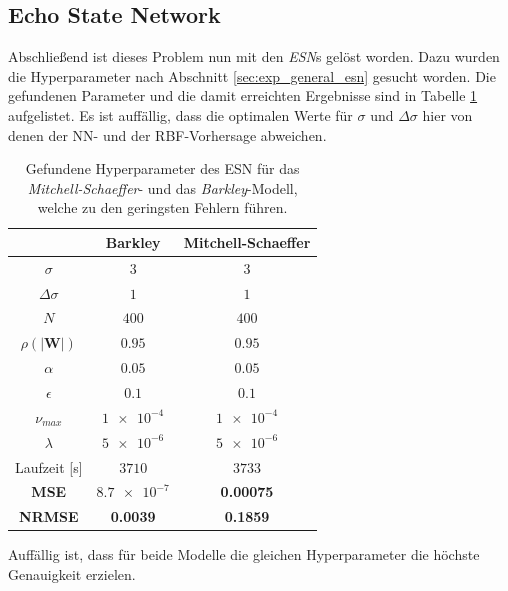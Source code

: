 \subsection{Echo State Network}
Abschließend ist dieses Problem nun mit den \textit{ESN}s gelöst worden. Dazu wurden die Hyperparameter nach Abschnitt \ref{sec:exp_general_esn} gesucht worden. Die gefundenen Parameter und die damit erreichten Ergebnisse sind in Tabelle \ref{tab:exp_cross_esn_results} aufgelistet. Es ist auffällig, dass die optimalen Werte für $\sigma$ und $\Delta \sigma$ hier von denen der NN- und der RBF-Vorhersage abweichen.
\begin{table}[h]
	\centering
	\captionsetup{width=0.9\linewidth}
	\begin{tabular}{|c|c|c|}
		\multicolumn{1}{c|}{} &  Barkley & Mitchell-Schaeffer \\ 
		\hline \hline 
		\rule[-1ex]{0pt}{2.5ex} $\sigma$ & $3$ & $3$ \\ 
		\hline 
		\rule[-1ex]{0pt}{2.5ex} $\Delta \sigma$ & $1$ & $1$ \\ 
		\hline 
		\rule[-1ex]{0pt}{3.5ex} $N$ & $400$ & $400$ \\ 
		\hline 
		\rule[-1ex]{0pt}{3.5ex} $\rho(|\mathbf{W}|)$ & $0.95$ & $0.95$\\ 
		\hline 
		\rule[-1ex]{0pt}{3.5ex} $\alpha$ & $0.05$ & $0.05$ \\ 
		\hline 
		\rule[-1ex]{0pt}{3.5ex} $\epsilon$ & $0.1$ & $0.1$ \\ 
		\hline 
		\rule[-1ex]{0pt}{3.5ex} $\nu_{max}$ & $\num{1e-4}$ & $\num{1e-4}$\\ 
		\hline 
		\rule[-1ex]{0pt}{3.5ex} $\lambda$ & $\num{5e-6}$ & $\num{5e-6}$\\ 
		\hline 
		\rule[-1ex]{0pt}{2.5ex} Laufzeit [s] & $3710$ & $3733$ \\ 
		\hline 
		\rule[-1ex]{0pt}{2.5ex} \textbf{MSE} & \textbf{$\num{8.7e-7}$} & \textbf{0.00075} \\ 
		\hline
		\rule[-1ex]{0pt}{2.5ex} \textbf{NRMSE} & \textbf{0.0039} & \textbf{0.1859} \\ 
		\hline 
	\end{tabular} 
	\caption{Gefundene Hyperparameter des \textsc{ESN} für das \textit{Mitchell-Schaeffer}- und das \textit{Barkley}-Modell, welche zu den geringsten Fehlern führen.}
	\label{tab:exp_cross_esn_results}
\end{table}

Auffällig ist, dass für beide Modelle die gleichen Hyperparameter die höchste Genauigkeit erzielen. 

